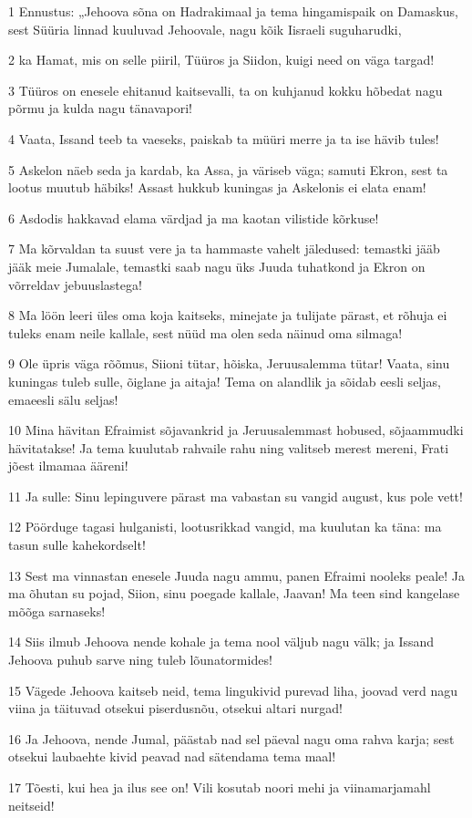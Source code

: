 \par 1 Ennustus: „Jehoova sõna on Hadrakimaal ja tema hingamispaik on Damaskus, sest Süüria linnad kuuluvad Jehoovale, nagu kõik Iisraeli suguharudki,
\par 2 ka Hamat, mis on selle piiril, Tüüros ja Siidon, kuigi need on väga targad!
\par 3 Tüüros on enesele ehitanud kaitsevalli, ta on kuhjanud kokku hõbedat nagu põrmu ja kulda nagu tänavapori!
\par 4 Vaata, Issand teeb ta vaeseks, paiskab ta müüri merre ja ta ise hävib tules!
\par 5 Askelon näeb seda ja kardab, ka Assa, ja väriseb väga; samuti Ekron, sest ta lootus muutub häbiks! Assast hukkub kuningas ja Askelonis ei elata enam!
\par 6 Asdodis hakkavad elama värdjad ja ma kaotan vilistide kõrkuse!
\par 7 Ma kõrvaldan ta suust vere ja ta hammaste vahelt jäledused: temastki jääb jääk meie Jumalale, temastki saab nagu üks Juuda tuhatkond ja Ekron on võrreldav jebuuslastega!
\par 8 Ma löön leeri üles oma koja kaitseks, minejate ja tulijate pärast, et rõhuja ei tuleks enam neile kallale, sest nüüd ma olen seda näinud oma silmaga!
\par 9 Ole üpris väga rõõmus, Siioni tütar, hõiska, Jeruusalemma tütar! Vaata, sinu kuningas tuleb sulle, õiglane ja aitaja! Tema on alandlik ja sõidab eesli seljas, emaeesli sälu seljas!
\par 10 Mina hävitan Efraimist sõjavankrid ja Jeruusalemmast hobused, sõjaammudki hävitatakse! Ja tema kuulutab rahvaile rahu ning valitseb merest mereni, Frati jõest ilmamaa ääreni!
\par 11 Ja sulle: Sinu lepinguvere pärast ma vabastan su vangid august, kus pole vett!
\par 12 Pöörduge tagasi hulganisti, lootusrikkad vangid, ma kuulutan ka täna: ma tasun sulle kahekordselt!
\par 13 Sest ma vinnastan enesele Juuda nagu ammu, panen Efraimi nooleks peale! Ja ma õhutan su pojad, Siion, sinu poegade kallale, Jaavan! Ma teen sind kangelase mõõga sarnaseks!
\par 14 Siis ilmub Jehoova nende kohale ja tema nool väljub nagu välk; ja Issand Jehoova puhub sarve ning tuleb lõunatormides!
\par 15 Vägede Jehoova kaitseb neid, tema lingukivid purevad liha, joovad verd nagu viina ja täituvad otsekui piserdusnõu, otsekui altari nurgad!
\par 16 Ja Jehoova, nende Jumal, päästab nad sel päeval nagu oma rahva karja; sest otsekui laubaehte kivid peavad nad sätendama tema maal!
\par 17 Tõesti, kui hea ja ilus see on! Vili kosutab noori mehi ja viinamarjamahl neitseid!



